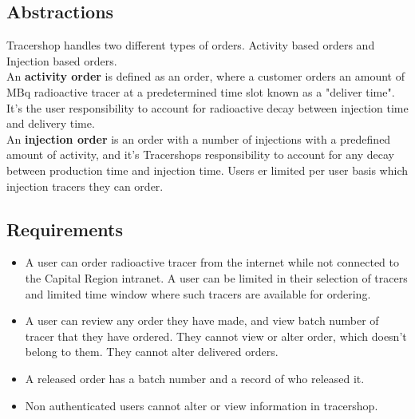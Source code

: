 \documentclass{article}
\begin{document}
\subsection*{Abstractions}
Tracershop handles two different types of orders. Activity based orders and Injection based orders.\\
An \textbf{activity order} is defined as an order, where a customer orders an amount of MBq radioactive tracer at a predetermined time slot known as a "deliver time".
It's the user responsibility to account for radioactive decay between injection time and delivery time.\\
An \textbf{injection order} is an order with a number of injections with a predefined amount of activity, and it's Tracershops responsibility to account for any decay between production time and injection time.
Users er limited per user basis which injection tracers they can order.

\subsection*{Requirements}

\begin{itemize}
  \item A user can order radioactive tracer from the internet while not connected to the Capital Region intranet.
  A user can be limited in their selection of tracers and limited time window where such tracers are available for ordering.
  \item A user can review any order they have made, and view batch number of tracer that they have ordered. They cannot view or alter order, which doesn't belong to them. They cannot alter delivered orders.
  \item A released order has a batch number and a record of who released it.
  \item Non authenticated users cannot alter or view information in tracershop.
\end{itemize}
\end{document}
